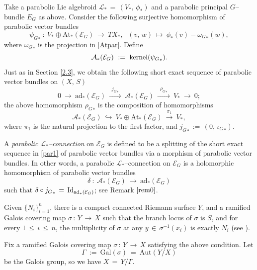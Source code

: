 \documentclass[12pt, reqno]{amsart}
\numberwithin{equation}{section}
\newcommand{\ad}{\textrm{ad}}
\newcommand{\Aut}{\textrm{Aut}}
\newcommand{\At}{\textrm{At}}
\newcommand{\Gal}{\textrm{Gal}}
\begin{document}
Take a parabolic Lie algebroid $\mathcal{L}_{*}\,=\,(V_{*},\,\phi_{*})$ and a parabolic principal $G$--bundle 
$E_{G}$ as above. Consider the following surjective homomorphism of parabolic vector bundles
$$
{\psi_{G}}_{*}\ :\ V_{*}\oplus \At_{*}(\mathcal{E}_{G})\ \longrightarrow\ TX_{*},\ \ \,
(v,\,w)\ \longmapsto\ \phi_{*}(v)-{\omega_{G}}_{*}(w),
$$
where ${\omega_{G}}_{*}$ is the projection in \eqref{Atpar}. Define
$$\mathcal{A}_{*}(\mathcal{E}_{G})\ :=\ {\rm kernel}({\psi_{G}}_{*}).$$
Just as in Section \ref{2.3}, we obtain the following short exact sequence of parabolic vector 
bundles on $(X,\,S)$
\begin{equation}\label{par1}
0\ \longrightarrow\ \ad_{*}(\mathcal{E}_{G})\ \xrightarrow{\,\,\,{j_{G}}_{*}\,\,\,}\ 
\mathcal{A}_{*}(\mathcal{E}_{G})\ \xrightarrow{\,\,\,{\rho_{G}}_{*}\,\,\,}\
V_{*}\ \longrightarrow\ 0;
\end{equation}
the above homomorphism ${\rho_{G}}_{*}$ is the composition of homomorphisms 
\[\mathcal{A}_{*}(\mathcal{E}_{G})\ \hookrightarrow\ V_{*}\oplus \At_{*}(\mathcal{E}_{G})
\ \overset{\pi_{1}}\longrightarrow\ V_{*},\]
where $\pi_1$ is the natural projection to the first factor, and
${j_{G}}_{*}\, :=\, (0,\, {\iota_{G}}_{*})$.

A {\it parabolic $\mathcal{L}_{*}$--connection} on $\mathcal{E}_{G}$ is defined to be a splitting of the short 
exact sequence in \eqref{par1} of parabolic vector bundles via a morphism of parabolic vector bundles. In 
other words, a parabolic $\mathcal{L}_{*}$--connection on $\mathcal{E}_{G}$ is a holomorphic homomorphism of 
parabolic vector bundles
$$
\delta\ :\ \mathcal{A}_{*}(\mathcal{E}_{G})\ \longrightarrow\ \ad_{*}(\mathcal{E}_{G})
$$
such that $\delta\circ {j_{G}}_{*}\,=\, {\rm Id}_{\ad_{*}(\mathcal{E}_{G})}$; see Remark $\ref{rem0}$. 

Given $\{N_i\}_{i=1}^n$, there is a compact connected Riemann surface
$Y$, and a ramified Galois covering map $\sigma\,:\, Y\,\longrightarrow\, X$ such that the branch locus of
$\sigma$ is $S$, and for every $1\,\leq\, i\,\leq \,n$, the multiplicity of $\sigma$ at any
$y\,\in\, \sigma^{-1}(x_{i})$ is exactly $N_{i}$
(see \cite[Proposition 1.2.12]{Na}).

Fix a ramified Galois covering map $\sigma\,:\, Y\,\longrightarrow\, X$ satisfying the above condition.
Let
$$
\Gamma\ :=\ \Gal(\sigma)\ =\ \Aut(Y/X)
$$
be the Galois group, so we have $X\,=\, Y/\Gamma$.
\end{document}
